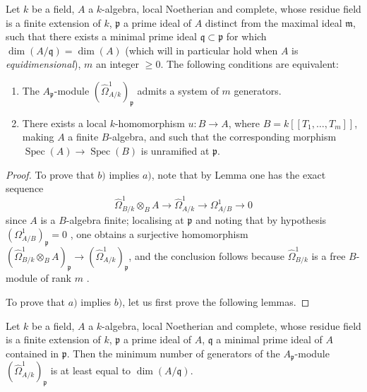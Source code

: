 \begin{proposition}[18.11.5]
\label{IV.18.11.5}
Let $k$ be a field, $A$ a $k$-algebra, local Noetherian and complete, whose residue field is a finite extension of $k$, $\mathfrak{p}$ a prime ideal of $A$ distinct from the maximal ideal $\mathfrak{m}$, such that there exists a minimal prime ideal $\mathfrak{q}\subset\mathfrak{p}$ for which $\dim(A/\mathfrak{q})=\dim(A)$ \textup{(which will in particular hold when $A$ is \emph{equidimensional})}, $m$ an integer $\geq 0$.
The following conditions are equivalent:
\begin{enumerate}[label=\emph{\alph*)}]
  \item The $A_\mathfrak{p}$-module $(\hat{\Omega}^1_{A/k})_\mathfrak{p}$ admits a system of $m$ generators.
  \item There exists a local $k$-homomorphism $u:B\to A$, where $B=k[[T_1,\ldots,T_m]]$, making $A$ a finite $B$-algebra, and such that the corresponding morphism $\operatorname{Spec}(A)\to\operatorname{Spec}(B)$ is unramified at $\mathfrak{p}$.
\end{enumerate}
\end{proposition}

\begin{proof}
To prove that $b)$ implies $a)$, note that by Lemma  one has the exact sequence
\[
  \hat{\Omega}^1_{B/k}\otimes_BA\to\hat{\Omega}^1_{A/k}\to\Omega^1_{A/B}\to 0
\]
since $A$ is a $B$-algebra finite; localising at $\mathfrak{p}$ and noting that by hypothesis $(\Omega^1_{A/B})_\mathfrak{p}=0$ , one obtains a surjective homomorphism $(\hat{\Omega}^1_{B/k}\otimes_BA)_\mathfrak{p}\to(\hat{\Omega}^1_{A/k})_\mathfrak{p}$, and the conclusion follows because $\hat{\Omega}^1_{B/k}$ is a free $B$-module of rank $m$ .

To prove that $a)$ implies $b)$, let us first prove the following lemmas.
\end{proof}

\begin{lemma}[18.11.5.1]
\label{IV.18.11.5.1}
Let $k$ be a field, $A$ a $k$-algebra, local Noetherian and complete, whose residue field is a finite extension of $k$, $\mathfrak{p}$ a prime ideal of $A$, $\mathfrak{q}$ a minimal prime ideal of $A$ contained in $\mathfrak{p}$.
Then the minimum number of generators of the $A_\mathfrak{p}$-module $(\hat{\Omega}^1_{A/k})_\mathfrak{p}$ is at least equal to $\dim(A/\mathfrak{q})$.
\end{lemma}

